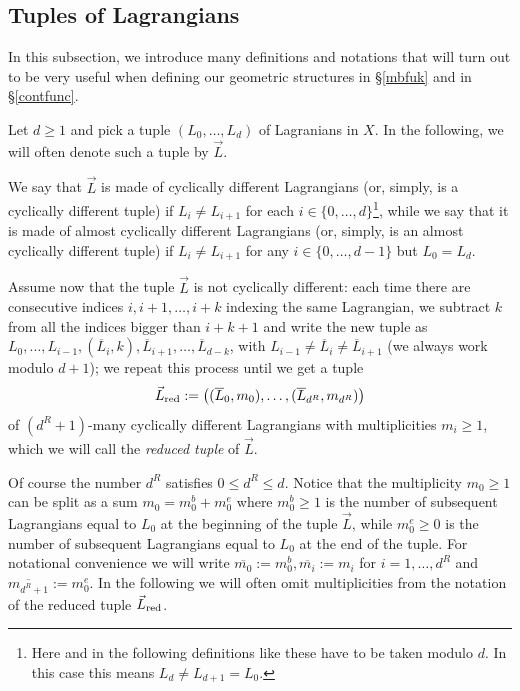 

\subsection{Tuples of Lagrangians}\label{tuplesoflags}  In this subsection, we introduce many definitions and notations that will turn out to be very useful when defining our geometric structures in \S \ref{mbfuk} and in \S \ref{contfunc}.

Let $d\geq 1$ and pick a tuple $(L_0,\ldots,L_d)$ of Lagranians in $X$. In the following, we will often denote such a tuple by $\vec{L}$.

\begin{dfn}
	We say that $\vec{L}$ is made of cyclically different Lagrangians \label{cicldiff} (or, simply, is a cyclically different tuple) if $L_i\neq L_{i+1}$ for each $i\in \{0,\ldots,d\}$\footnote{Here and in the following definitions like these have to be taken modulo $d$. In this case this means $L_d\neq L_{d+1}=L_0$.}, while we say that it is made of almost cyclically different Lagrangians (or, simply, is an almost cyclically different tuple) if $L_i\neq L_{i+1}$ for any $i\in \{0,\ldots,d-1\}$ but $L_0=L_d$.
\end{dfn} 
\begin{dfn}\label{defreducedtuple} Assume now that the tuple $\vec{L}$ is not cyclically different: each time there are consecutive indices $i,i+1,\ldots,i+k$ indexing the same Lagrangian, we subtract $k$ from all the indices bigger than $i+k+1$ and write the new tuple as $L_0,\ldots,L_{i-1}, (\overline{L}_i, k), \overline{L}_{i+1},\ldots,\overline{L}_{d-k}$, with $L_{i-1}\neq \overline{L}_i\neq \overline{L}_{i+1}$ (we always work modulo $d+1$); we repeat this process until we get a tuple $$ \vec{L}_\textnormal{red}:=\left((\overline{L}_0,m_0),\ldots,(\overline{L}_{d^R},m_{d^R})\right)$$ of $(d^R+1)$-many cyclically different Lagrangians with multiplicities $m_i\geq 1$, which we will call the \textit{reduced tuple} of $\vec{L}$.
\end{dfn}

\noindent Of course the number $d^R$ satisfies $0\leq d^R\leq d$. Notice that the multiplicity $m_0\geq 1$ can be split as a sum $m_0= m_0^b+m_0^e$ where $m_0^b\geq 1$ is the number of subsequent Lagrangians equal to $L_0$ at the beginning of the tuple $\vec{L}$, while $m_0^e\geq 0$ is the number of subsequent Lagrangians equal to $L_0$ at the end of the tuple. \label{defofmis} For notational convenience we will write $\overline{m_0}:=m_0^b, \overline{m_i}:=m_i$ for $i=1,\ldots,d^R$ and $\overline{m_{d^R+1}}:=m_0^e$. In the following we will often omit multiplicities from the notation of the reduced tuple $\vec{L}_\textnormal{red}$. 

